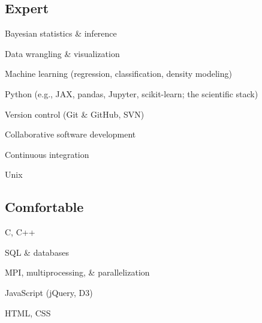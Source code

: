 \documentclass[letterpaper,12pt]{deedy-resume}
\begin{document}
\begin{minipage}[t]{0.32\textwidth}
\subsection{Expert}
\begin{tighteritemize}
    \item Bayesian statistics \& inference
    \item Data wrangling \& visualization
    \item Machine learning (regression, classification, density modeling)
    \item Python {\footnotesize (e.g., JAX, pandas, Jupyter, scikit-learn; the scientific stack)}
    \item Version control (Git \& GitHub, SVN)
    \item Collaborative software development
    \item Continuous integration
    \item Unix
\end{tighteritemize}

\sectionspace %

\subsection{Comfortable}
\begin{tighteritemize}
    \item C, C++
    \item SQL \& databases
    \item MPI, multiprocessing, \& parallelization
    \item JavaScript {\footnotesize (jQuery, D3)}
    \item HTML, CSS
\end{tighteritemize}

\sectionspace %




\end{minipage}
\end{document}
